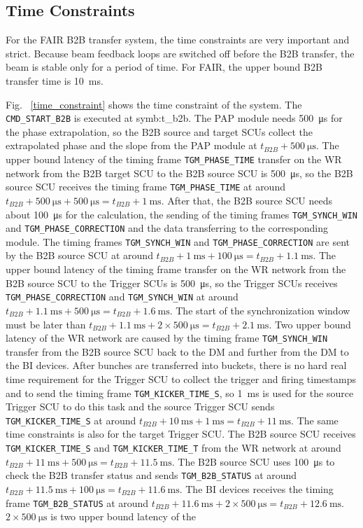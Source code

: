 \subsection{Time Constraints}
For the FAIR B2B transfer system, the time constraints are very important and strict. Because beam feedback loops are switched off before the B2B transfer, the beam is stable only for a period of time. For FAIR, the upper bound B2B transfer time is \SI{10}{\ms}. 

Fig. ~\ref{time_constraint} shows the time constraint of the system. The \verb|CMD_START_B2B| is executed at \gls{symb:t_b2b}. The PAP module needs \SI{500}{\us} for the phase extrapolation, so the B2B source and target SCUs collect the extrapolated phase and the slope from the PAP module at $t_\mathit{B2B} + \SI{500}{\us}$. The upper bound latency of the timing frame \verb|TGM_PHASE_TIME| transfer on the WR network from the B2B target SCU to the B2B source SCU is \SI{500}{\us}, so the B2B source SCU receives the timing frame \verb|TGM_PHASE_TIME| at around $t_\mathit{B2B} + \SI{500}{\us} + \SI{500}{\us} = t_\mathit{B2B} + \SI{1}{\ms}$. After that, the B2B source SCU needs about \SI{100}{\us} for the calculation, the sending of the timing frames \verb|TGM_SYNCH_WIN| and \verb|TGM_PHASE_CORRECTION| and the data transferring to the corresponding module. The timing frames \verb|TGM_SYNCH_WIN| and \verb|TGM_PHASE_CORRECTION| are sent by the B2B source SCU at around $t_\mathit{B2B} + \SI{1}{\ms} + \SI{100}{\us} = t_\mathit{B2B} + \SI{1.1}{\ms}$. The upper bound latency of the timing frame transfer on the WR network from the B2B source SCU to the Trigger SCUs is \SI{500}{\us}, so the Trigger SCUs receives \verb|TGM_PHASE_CORRECTION| and \verb|TGM_SYNCH_WIN| at around $t_\mathit{B2B} + \SI{1.1}{\ms} + \SI{500}{\us} = t_\mathit{B2B} + \SI{1.6}{\ms}$. The start of the synchronization window must be later than $t_\mathit{B2B} + \SI{1.1}{\ms} + 2\times\SI{500}{\us} = t_\mathit{B2B} + \SI{2.1}{\ms}$. Two upper bound latency of the WR network are caused by the timing frame \verb|TGM_SYNCH_WIN| transfer from the B2B source SCU back to the DM and further from the DM to the BI devices. After bunches are transferred into buckets, there is no hard real time requirement for the Trigger SCU to collect the trigger and firing timestamps and to send the timing frame \verb|TGM_KICKER_TIME_S|, so \SI{1}{\ms} is used for the source Trigger SCU to do this task and the source Trigger SCU sends \verb|TGM_KICKER_TIME_S| at around $t_\mathit{B2B} + \SI{10}{\ms} + \SI{1}{\ms} = t_\mathit{B2B} + \SI{11}{\ms}$. The same time constraints is also for the target Trigger SCU. The B2B source SCU receives \verb|TGM_KICKER_TIME_S| and \verb|TGM_KICKER_TIME_T| from the WR network at around $t_\mathit{B2B} + \SI{11}{\ms} + \SI{500}{\us} = t_\mathit{B2B} + \SI{11.5}{\ms}$. The B2B source SCU uses \SI{100}{\us} to check the B2B transfer status and sends \verb|TGM_B2B_STATUS| at around $t_\mathit{B2B} + \SI{11.5}{\ms} + \SI{100}{\us} = t_\mathit{B2B} + \SI{11.6}{\ms}$. The BI devices receives the timing frame \verb|TGM_B2B_STATUS| at around $t_\mathit{B2B} + \SI{11.6}{\ms} + 2\times\SI{500}{\us} = t_\mathit{B2B} + \SI{12.6}{\ms}$. $2\times\SI{500}{\us}$ is two upper bound latency of the 